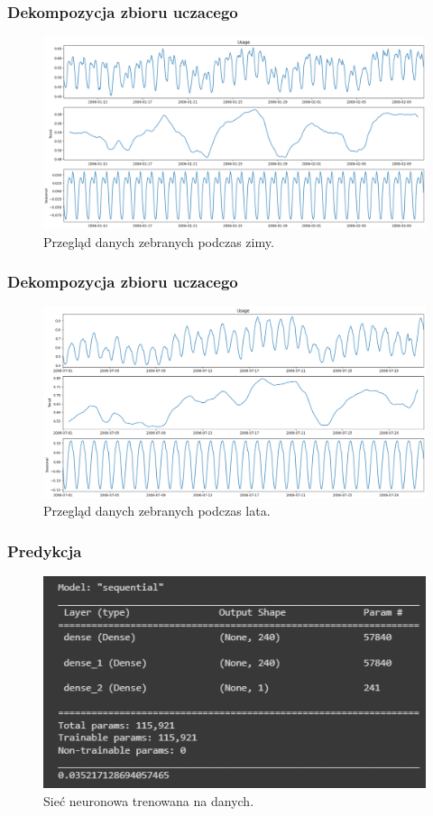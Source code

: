 \documentclass[]{beamer}
\begin{document}
\begin{frame}
  \frametitle{Dekompozycja zbioru uczacego}

  \begin{figure}
    \centering
    \includegraphics[width=0.99\linewidth]{zima.png}
    \caption{Przegląd danych zebranych podczas zimy.}
  \end{figure}

\end{frame}

\begin{frame}
  \frametitle{Dekompozycja zbioru uczacego}

  \begin{figure}
    \centering
    \includegraphics[width=0.99\linewidth]{lato.png}
    \caption{Przegląd danych zebranych podczas lata.}
  \end{figure}

\end{frame}


\begin{frame}
  \frametitle{Predykcja}

  \begin{figure}
    \centering
    \includegraphics[width=0.70\linewidth]{neuronki.png}
    \caption{Sieć neuronowa trenowana na danych.}
  \end{figure}

\end{frame}
\end{document}
